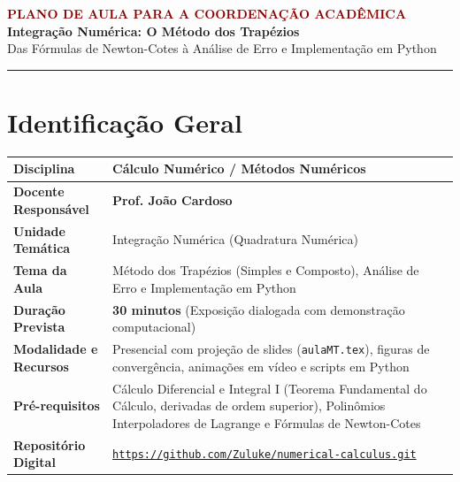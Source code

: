 \documentclass[11pt,a4paper]{article}
\begin{document}
\begin{center}
    {\LARGE \textbf{\textcolor{darkred}{PLANO DE AULA PARA A COORDENAÇÃO ACADÊMICA}}}\\[0.4em]
    {\large \textbf{Integração Numérica: O Método dos Trapézios}}\\[0.2em]
    {\normalsize Das Fórmulas de Newton-Cotes à Análise de Erro e Implementação em Python}\\[0.6em]
    \rule{\textwidth}{1.2pt}
\end{center}

\vspace{0.2cm}

\section{Identificação Geral}

\begin{center}
\renewcommand{\arraystretch}{1.28}
\begin{tabularx}{\textwidth}{|>{\bfseries}p{4.3cm}|X|}
\hline
Disciplina & Cálculo Numérico / Métodos Numéricos \\
\hline
Docente Responsável & \textbf{Prof. João Cardoso} \\
\hline
Unidade Temática & Integração Numérica (Quadratura Numérica) \\
\hline
Tema da Aula & Método dos Trapézios (Simples e Composto), Análise de Erro e Implementação em Python \\
\hline
Duração Prevista & \textbf{30 minutos} (Exposição dialogada com demonstração computacional) \\
\hline
Modalidade e Recursos & Presencial com projeção de slides (\texttt{aulaMT.tex}), figuras de convergência, animações em vídeo e scripts em Python \\
\hline
Pré-requisitos & Cálculo Diferencial e Integral I (Teorema Fundamental do Cálculo, derivadas de ordem superior), Polinômios Interpoladores de Lagrange e Fórmulas de Newton-Cotes \\
\hline
Repositório Digital & \href{https://github.com/Zuluke/numerical-calculus.git}{\nolinkurl{https://github.com/Zuluke/numerical-calculus.git}} \\
\hline
\end{tabularx}
\end{center}
\end{document}
